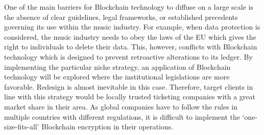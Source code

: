 \documentclass[a4paper,8pt,UTF8]{scrartcl}
\begin{document}
One of the main barriers for Blockchain technology to diffuse on a large scale is the absence of clear guidelines, legal frameworks, or established precedents governing its use within the music industry. For example, when data protection is considered, the music industry needs to obey the laws of the EU which gives the right to individuals to delete their data. This, however, conflicts with Blockchain technology which is designed to prevent retroactive alterations to its ledger. By implementing the particular niche strategy, an application of Blockchain technology will be explored where the institutional legislations are more favorable. Redesign is almost inevitable in this case. Therefore, target clients in line with this strategy would be locally trusted ticketing companies with a great market share in their area. As global companies have to follow the rules in multiple countries with different regulations, it is difficult to implement the ‘one-size-fits-all’ Blockchain encryption in their operations. 
















\end{document}
